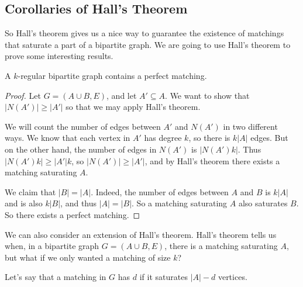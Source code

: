 


\subsection{Corollaries of Hall's Theorem}

So Hall's theorem gives us a nice way to guarantee the existence of matchings that saturate a part of a bipartite graph. We are going to use Hall's theorem to prove some interesting results.


\begin{corollary}
	A $k$-regular bipartite graph contains a perfect matching.
\end{corollary}
\begin{proof}
	Let $G = (A \cup B, E)$, and let $A' \subseteq A$. We want to show that $|N(A')| \geq |A'|$ so that we may apply Hall's theorem.

	We will count the number of edges between $A'$ and $N(A')$ in two different ways. We know that each vertex in $A'$ has degree $k$, so there is $k|A|$ edges. But on the other hand, the number of edges in $N(A')$ is $|N(A')k|$. Thus $|N(A')k| \geq |A'|k$, so $|N(A')| \geq |A'|$, and by Hall's theorem
	there exists a matching saturating $A$.

	We claim that $|B| = |A|$. Indeed, the number of edges between $A$ and $B$ is $k|A|$ and is also $k|B|$, and thus $|A| = |B|$. So a matching saturating $A$ also saturates $B$. So there exists a perfect matching.
\end{proof}

We can also consider an extension of Hall's theorem. Hall's theorem tells us when, in a bipartite graph $G = (A \cup B, E)$, there is a matching saturating $A$, but what if we only wanted a matching of size $k$?

Let's say that a matching in $G$ has  $d$ if it saturates $|A| - d$ vertices. 

